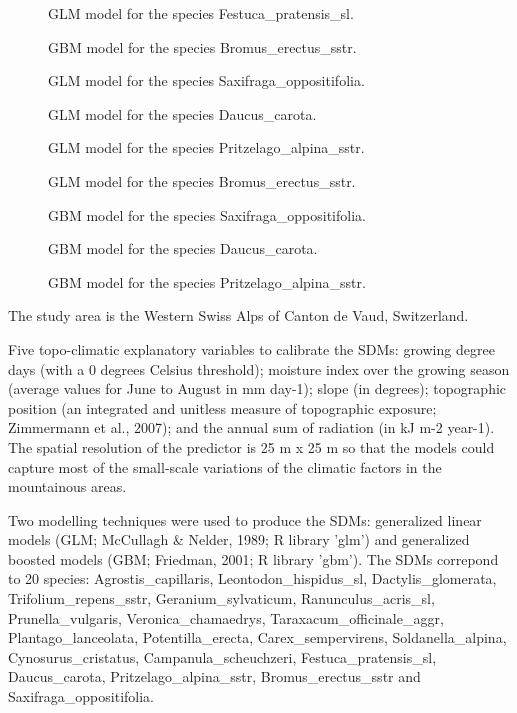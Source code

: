 \documentclass[a4paper]{book}
\begin{document}
\begin{Format}
\begin{description}
\item[] GLM model for the species Festuca\_pratensis\_sl.
\item[] GBM model for the species Bromus\_erectus\_sstr.
\item[] GLM model for the species Saxifraga\_oppositifolia.
\item[] GLM model for the species Daucus\_carota.
\item[] GLM model for the species Pritzelago\_alpina\_sstr.
\item[] GLM model for the species Bromus\_erectus\_sstr.
\item[] GBM model for the species Saxifraga\_oppositifolia.
\item[] GBM model for the species Daucus\_carota.
\item[] GBM model for the species Pritzelago\_alpina\_sstr.

\end{description}

\end{Format}
%
\begin{Details}\relax
The study area is the Western Swiss Alps of Canton de Vaud, Switzerland.

Five topo-climatic explanatory variables to calibrate the SDMs: growing degree days (with a 0 degrees Celsius threshold); moisture index over the growing season (average values for June to August in mm day-1); slope (in degrees); topographic position (an integrated and unitless measure of topographic exposure; Zimmermann et al., 2007); and the annual sum of radiation (in kJ m-2 year-1). The spatial resolution of the predictor is 25 m x 25 m so that the models could capture most of the small-scale variations of the climatic factors in the mountainous areas.

Two modelling techniques were used to produce the SDMs: generalized linear models (GLM; McCullagh \& Nelder, 1989; R library 'glm') and generalized boosted models (GBM; Friedman, 2001; R library 'gbm'). The SDMs correpond to 20 species: Agrostis\_capillaris, Leontodon\_hispidus\_sl, Dactylis\_glomerata, Trifolium\_repens\_sstr, Geranium\_sylvaticum, Ranunculus\_acris\_sl, Prunella\_vulgaris, Veronica\_chamaedrys, Taraxacum\_officinale\_aggr, Plantago\_lanceolata, Potentilla\_erecta, Carex\_sempervirens, Soldanella\_alpina, Cynosurus\_cristatus, Campanula\_scheuchzeri, Festuca\_pratensis\_sl, Daucus\_carota, Pritzelago\_alpina\_sstr, Bromus\_erectus\_sstr and Saxifraga\_oppositifolia.
\end{Details}
\end{document}
